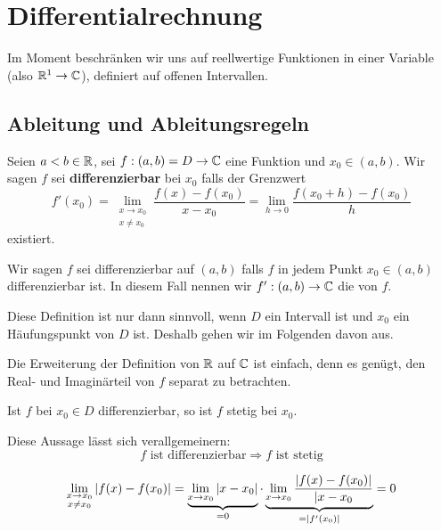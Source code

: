 \documentclass[main.tex]{subfiles}
\begin{document}
\chapter{Differentialrechnung}


\begin{Bemerkung}
  Im Moment beschränken wir uns auf reellwertige Funktionen in einer Variable (also $\mathbb{R}^1 \to \mathbb{C}$), definiert auf offenen Intervallen.
\end{Bemerkung}


\section{Ableitung und Ableitungsregeln}

\begin{Definition}[Differenzierbarkeit]
  Seien $a < b \in \mathbb{R}$, sei $f:(a,b) = D \to \mathbb{C}$ eine Funktion und $x_0 \in (a,b)$. Wir sagen $f$ sei \textbf{differenzierbar} bei $x_0$ falls der Grenzwert
  $$f'(x_0) = \lim \limits_{\substack{x \to x_0 \\ x \neq x_0}} \dfrac{f(x)-f(x_0)}{x - x_0} = \lim \limits_{h\to 0} \dfrac{f(x_0+h)-f(x_0)}{h}$$
  existiert.

  Wir sagen $f$ sei differenzierbar auf $(a,b)$ falls $f$ in jedem Punkt $x_0 \in (a,b)$ differenzierbar ist. In diesem Fall nennen wir $f':(a,b) \to \mathbb{C}$ die  von $f$.
\end{Definition}


\begin{Bemerkung}
  Diese Definition ist nur dann sinnvoll, wenn $D$ ein Intervall ist und $x_0$ ein Häufungspunkt von $D$ ist. Deshalb gehen wir im Folgenden davon aus.
\end{Bemerkung}

\begin{Bemerkung}
  Die Erweiterung der Definition von $\mathbb{R}$ auf $\mathbb{C}$ ist einfach, denn es genügt, den Real- und Imaginärteil von $f$ separat zu betrachten.
\end{Bemerkung}

\begin{Bemerkung}
  \begin{Theorem}
    Ist $f$ bei $x_0 \in D$ differenzierbar, so ist $f$ stetig bei $x_0$.

    Diese Aussage lässt sich verallgemeinern:
    $$f \text{ ist differenzierbar} \Rightarrow f \text{ ist stetig}$$
  \end{Theorem}
  \begin{Beweis}
    $$\lim \limits_{\substack{x \to x_0 \\ x \neq x_0}}|f(x)-f(x_0)| = \underbrace{\lim \limits_{x \to x_0} |x - x_0|}_{=0} \cdot \underbrace{\lim \limits_{x \to x_0} \dfrac{|f(x)-f(x_0)|}{|x - x_0}}_{= |f'(x_0)|} = 0$$
  \end{Beweis}
\end{Bemerkung}
\end{document}

